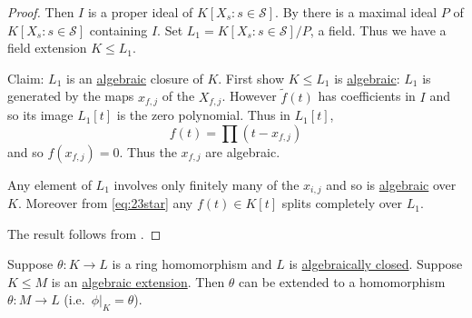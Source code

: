\documentclass{article}
\begin{document}
\begin{proof}
    Then $I$ is a proper ideal of $K[X_s : s \in \mathcal{S}]$. By  there is a maximal ideal $P$ of $K[X_s : s \in \mathcal{S}]$ containing $I$.
    Set $L_1 = K[X_s : s \in \mathcal{S}]/P$, a field.
    Thus we have a field extension $K \leq L_1$.

    Claim: $L_1$ is an \hyperlink{def:closure}{algebraic} closure of $K$.
    First show $K \leq L_1$ is \hyperlink{def:algebraic}{algebraic}: $L_1$ is generated by the maps $x_{f,j}$ of the $X_{f,j}$.
    However $\tilde{f}(t)$ has coefficients in $I$ and so its image $L_1[t]$ is the zero polynomial.
    Thus in $L_1[t]$,
    \begin{equation*}
        f(t) = \prod (t - x_{f,j}) \label{eq:23star}\tag{$*$}
    \end{equation*}
    and so $f(x_{f,j}) = 0$. Thus the $x_{f,j}$ are algebraic.

    Any element of $L_1$ involves only finitely many of the $x_{i,j}$ and so is \hyperlink{def:algebraic}{algebraic} over $K$.
    Moreover from \eqref{eq:23star} any $f(t) \in K[t]$ splits completely over $L_1$.

    The result follows from .
\end{proof}
\begin{nthm}\label{thm:5.8}
    Suppose $\theta: K \to L$ is a ring homomorphism and $L$ is \hyperlink{def:closed}{algebraically closed}.
    Suppose $K \leq M$ is an \hyperlink{def:algebraic}{algebraic extension}.
    Then $\theta$ can be extended to a homomorphism $\theta: M \to L$ (i.e.\ $\phi|_K = \theta$).
\end{nthm}
\end{document}
